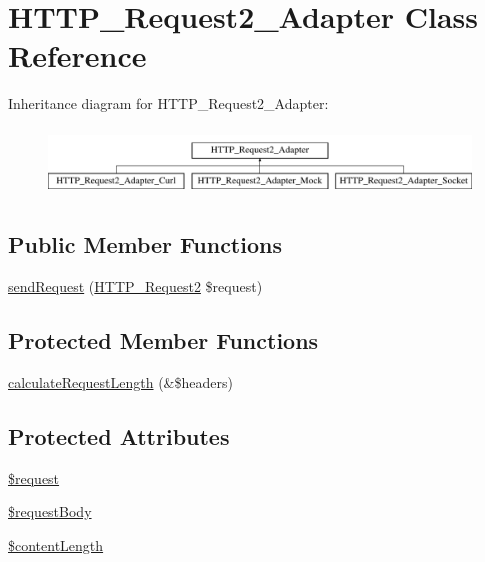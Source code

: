 \hypertarget{classHTTP__Request2__Adapter}{\section{H\-T\-T\-P\-\_\-\-Request2\-\_\-\-Adapter Class Reference}
\label{classHTTP__Request2__Adapter}
}
Inheritance diagram for H\-T\-T\-P\-\_\-\-Request2\-\_\-\-Adapter\-:\begin{figure}[H]
\begin{center}
\leavevmode
\includegraphics[height=1.812298cm]{classHTTP__Request2__Adapter}
\end{center}
\end{figure}
\subsection*{Public Member Functions}
\begin{DoxyCompactItemize}
\item 
\hyperlink{classHTTP__Request2__Adapter_a4a9516fe4151ea9492952b3706f21e08}{send\-Request} (\hyperlink{classHTTP__Request2}{H\-T\-T\-P\-\_\-\-Request2} \$request)
\end{DoxyCompactItemize}
\subsection*{Protected Member Functions}
\begin{DoxyCompactItemize}
\item 
\hyperlink{classHTTP__Request2__Adapter_a046d93dce3a7735a7cc0e4564593de5d}{calculate\-Request\-Length} (\&\$headers)
\end{DoxyCompactItemize}
\subsection*{Protected Attributes}
\begin{DoxyCompactItemize}
\item 
\hyperlink{classHTTP__Request2__Adapter_ad7df680c105146f9fdd4b386220be914}{\$request}
\item 
\hyperlink{classHTTP__Request2__Adapter_acc40d409a0582abb82d8ededa68c73d7}{\$request\-Body}
\item 
\hyperlink{classHTTP__Request2__Adapter_ac8dc7108f1d54ec9b94224f57577cc3e}{\$content\-Length}
\end{DoxyCompactItemize}

